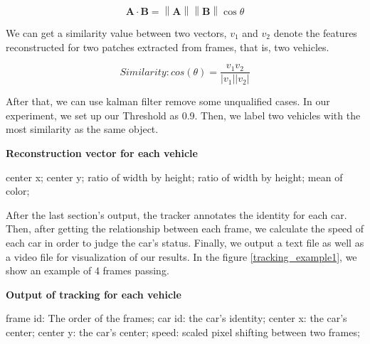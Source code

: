 \documentclass[10pt,twocolumn,letterpaper]{article}
\begin{document}
$${\mathbf {A} \cdot \mathbf {B} =\left\|\mathbf {A} \right\|\left\|\mathbf {B} \right\|\cos \theta }$$

We can get a similarity value between two vectors, $v_1$ and $v_2$ denote the features reconstructed for two patches extracted from frames, that is, two vehicles.

$$Similarity: cos(\theta) = \frac{v_1v_2}{|v_1||v_2|}$$

 After that, we can use kalman filter remove some unqualified cases. In our experiment, we set up our Threshold as 0.9. Then, we label two vehicles with the most similarity as the same object.

\begin{algorithm}[!tbp]
\label{output_detection}
\begin{algorithmic}[0]
\State \textbf{Reconstruction vector for each vehicle} 
\end{algorithmic}

\begin{algorithmic}[1]
\State center x;
\State center y;
\State ratio of width by height;
\State ratio of width by height; 
\State mean of color;
\end{algorithmic}
\end{algorithm}

After the last section's output, the tracker annotates the identity for each car. Then, after getting the relationship between each frame, we calculate the speed of each car in order to judge the car's status. Finally, we output a text file as well as a video file for visualization of our results. In the figure \ref{tracking_example1}, we show an example of 4 frames passing.

\begin{algorithm}[!tbp]
\label{output_detection}
\begin{algorithmic}[0]
\State \textbf{Output of tracking for each vehicle} 
\end{algorithmic}

\begin{algorithmic}[1]
\State frame id: The order of the frames;
\State car id: the car's identity;
\State center x: the car's center;
\State center y: the car's center;
\State speed: scaled pixel shifting between two frames;
\end{algorithmic}
\end{algorithm}
\end{document}
